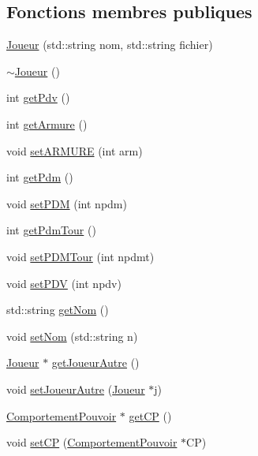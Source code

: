 \subsection*{Fonctions membres publiques}
\begin{DoxyCompactItemize}
\item 
\hyperlink{class_joueur_a055a0bc38f47a424243d44e7078af129}{Joueur} (std\-::string nom, std\-::string fichier)
\item 
\hyperlink{class_joueur_a9fb594f755601ee77ce5884c4c0861f3}{$\sim$\-Joueur} ()
\item 
int \hyperlink{class_joueur_a3deefa81ebbb921d6cef52322777dee7}{get\-Pdv} ()
\item 
int \hyperlink{class_joueur_adab9394b18e1e65a77aa8dad7b51ec28}{get\-Armure} ()
\item 
void \hyperlink{class_joueur_a2ff017f6e65cad383d00d153ece08045}{set\-A\-R\-M\-U\-R\-E} (int arm)
\item 
int \hyperlink{class_joueur_ac950c36b21e1dfc7038d9bb4e1f53361}{get\-Pdm} ()
\item 
void \hyperlink{class_joueur_a199d04e5240f4078ba2f3da2431f0bb2}{set\-P\-D\-M} (int npdm)
\item 
int \hyperlink{class_joueur_ab9297495de7521ac2198c7ce8d38191c}{get\-Pdm\-Tour} ()
\item 
void \hyperlink{class_joueur_a3984848768db7e175aeeb51ca89e4eb3}{set\-P\-D\-M\-Tour} (int npdmt)
\item 
void \hyperlink{class_joueur_ac4b9408bed0a64ac63188f7f8e1a73d9}{set\-P\-D\-V} (int npdv)
\item 
std\-::string \hyperlink{class_joueur_a5ba8036208a35efd6bf37a86b36063b0}{get\-Nom} ()
\item 
void \hyperlink{class_joueur_afa24ba80453522ff059e7e6f46653749}{set\-Nom} (std\-::string n)
\item 
\hyperlink{class_joueur}{Joueur} $\ast$ \hyperlink{class_joueur_a0a2f88581ef12441b03a1cc4ed721b40}{get\-Joueur\-Autre} ()
\item 
void \hyperlink{class_joueur_a81aa9fca9a001be893bfaa607681b086}{set\-Joueur\-Autre} (\hyperlink{class_joueur}{Joueur} $\ast$j)
\item 
\hyperlink{class_comportement_pouvoir}{Comportement\-Pouvoir} $\ast$ \hyperlink{class_joueur_a85df9863c4257fe7405a6b1fe7c1e1ef}{get\-C\-P} ()
\item 
void \hyperlink{class_joueur_a7b408ea957e1b125a509ec8e88b2c148}{set\-C\-P} (\hyperlink{class_comportement_pouvoir}{Comportement\-Pouvoir} $\ast$C\-P)

\end{DoxyCompactItemize}

